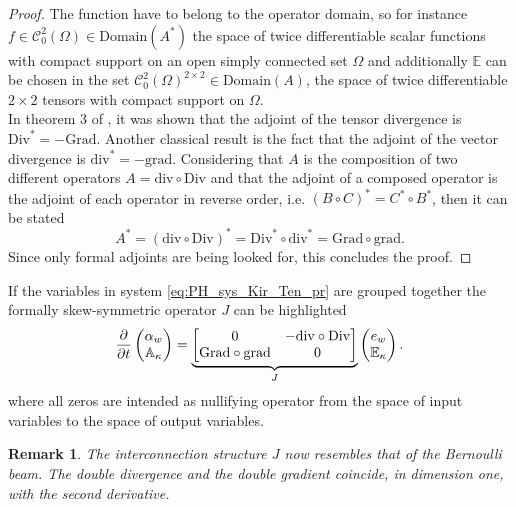 \documentclass[preprint,12pt]{elsarticle}
\newtheorem{remark}{Remark}
\begin{document}
\begin{proof}
The function have to belong to the operator domain, so for instance $f \in \mathcal{C}_0^2(\Omega) \in \mathrm{Domain}(A^*)$ the space of twice differentiable scalar functions with compact support on an open simply connected set $\Omega$ and additionally $\mathbb{E}$ can be chosen in the set $\mathcal{C}_{0}^2(\Omega)^{2 \times 2} \in \mathrm{Domain}(A)$, the space of twice differentiable $2 \times 2$ tensors with compact support on $\Omega$. \\
In theorem 3 of \cite{BrugnoliMin}, it was shown that the adjoint of the tensor divergence is $\mathrm{Div}^* = -\mathrm{Grad}$. Another classical result is the fact that the adjoint of the vector divergence is $\mathrm{div}^* = -\mathrm{grad}$. Considering that $A$ is the composition of two different operators $A = \mathrm{div} \circ \mathrm{Div}$ and that the adjoint of a composed operator is the adjoint of each operator in reverse order, i.e. $(B \circ C)^* = C^* \circ B^*$, then it can be stated
\[
 A^* = (\mathrm{div} \circ \mathrm{Div})^* = \mathrm{Div}^* \circ \mathrm{div}^* = \mathrm{Grad} \circ \mathrm{grad}.
\]  
Since only formal adjoints are being looked for, this concludes the proof.
\end{proof}
If the variables in system \eqref{eq:PH_sys_Kir_Ten_pr} are grouped together the formally skew-symmetric operator $J$ can be highlighted 
	\begin{equation}
	\label{eq:PH_sys_Kir_Ten}
	\diffp{}{t}
	\begin{pmatrix}
	\alpha_w \\
	\mathbb{A}_{\kappa} \\
	\end{pmatrix} = 
	\underbrace{\begin{bmatrix}
		0  &  - \mathrm{div} \circ \mathrm{Div} \\
		\mathrm{Grad} \circ \mathrm{grad} & 0 \\
		\end{bmatrix}}_{J}
	\begin{pmatrix}
	e_w \\
	\mathbb{E}_{\kappa} \\
	\end{pmatrix}.
	\end{equation}
	where all zeros are intended as nullifying operator from the space of input variables to the space of output variables.
	\begin{remark}
	The interconnection structure $J$ now resembles that of the Bernoulli beam. The double divergence and the double gradient coincide, in dimension one, with the second derivative.
	\end{remark}
\end{document}
